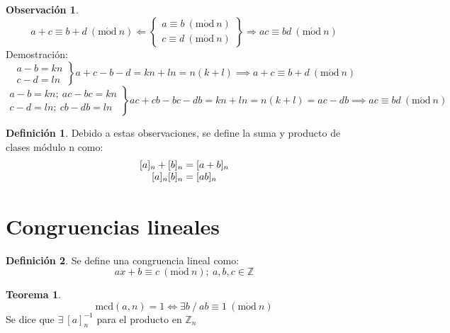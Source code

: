 \documentclass[10pt,a4paper]{article}
\theoremstyle{definition}
\newtheorem{definition}{Definición}[section]
\newtheorem{theorem}{Teorema}[section]
\newtheorem{obs}{Observación}[section]
\newcommand{\Mod}[1]{\ (\mathrm{m\acute od}\ #1)}
\begin{document}
\begin{obs}
	\[a+c\equiv b+d\Mod{n}
	\Longleftarrow\left\{\begin{array}{c}
		a\equiv b\Mod{n}\\ 
		c\equiv d\Mod{n}
	\end{array}\right\}\Longrightarrow
	ac\equiv bd\Mod{n}\]
Demostración:
\[\left.\begin{array}{c}
	a-b = kn\\
	c-d = ln
\end{array}\right\}a+c-b-d = kn+ln = n(k+l)\implies a+c\equiv b+d\Mod{n}
\]
\[\left.\begin{array}{c}
	a-b = kn;\:ac-bc = kn\\
	c-d = ln;\:cb-db = ln
\end{array}\right\}ac+cb-bc-db = kn+ln= n(k+l) = ac-db \implies ac\equiv bd \Mod{n} \]
\end{obs}
\begin{definition}
	Debido a estas observaciones, se define la suma y producto de clases módulo n como:
\[
\begin{array}{c}
	[a]_n+[b]_n = [a+b]_n\\\relax
	[a]_n [b]_n = [ab]_n
\end{array}
\]
\end{definition}

\section{Congruencias lineales}
\begin{definition} Se define una congruencia lineal como:
	\[ax+b\equiv c \Mod{n};\: a,b,c\in\mathbb{Z}\]
\end{definition}
\begin{theorem}
	\[\text{mcd}(a,n) = 1 \iff \exists b\:/\:ab\equiv 1\Mod{n}\]
	Se dice que $\exists\:[a]_n^{-1}$ para el producto en $\mathbb{Z}_n$
\end{theorem}
\end{document}
